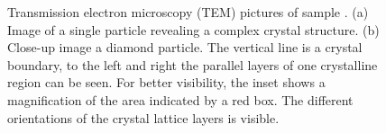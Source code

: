 				\begin{figure}[!htb]
					\begin{subfigure}[t]{ 0.49\linewidth}
						\centering
						\caption{}
						\label{subfig::tem_crystal}
					\end{subfigure}
					\hfill
					\begin{subfigure}[t]{ 0.49\linewidth}
						\centering
						\caption{}
						\label{subfig::tem_boundary}
					\end{subfigure}
					\caption[\TEM imaging of a single \nd]{Transmission electron microscopy (TEM) pictures of sample \insituH. (a) Image of a single \nd particle revealing a complex crystal structure. (b) Close-up image a diamond particle. The vertical line is a crystal boundary, to the left and right the parallel layers of one crystalline region can be seen. For better visibility, the inset shows a magnification of the area indicated by a red box. The different orientations of the crystal lattice layers is visible.}
					\label{fig::tem}
				\end{figure}
